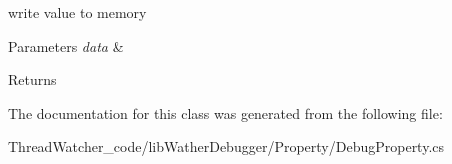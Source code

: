 write value to memory 


\begin{DoxyParams}{Parameters}
{\em data} & \\
\hline
\end{DoxyParams}
\begin{DoxyReturn}{Returns}

\end{DoxyReturn}


The documentation for this class was generated from the following file\+:\begin{DoxyCompactItemize}
\item 
Thread\+Watcher\+\_\+code/lib\+Wather\+Debugger/\+Property/Debug\+Property.\+cs\end{DoxyCompactItemize}
